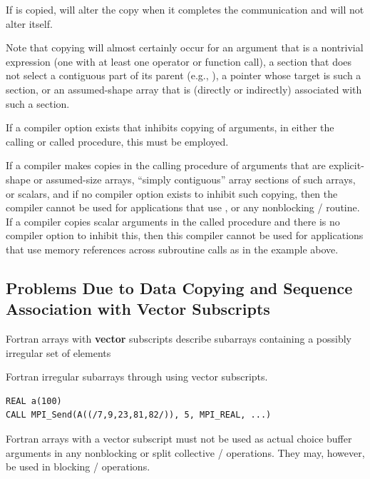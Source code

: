\begin{itemize}
If  is copied,  will alter the copy when it completes the
communication and will not alter  itself.

Note that copying will almost certainly occur for an argument that is a
nontrivial expression (one with at least one operator or function
call), a section that does not select a contiguous part of its parent
(e.g., ), a pointer whose target is such a section, or an
assumed-shape array that is (directly or indirectly) associated with
such a section.

If a compiler option exists that inhibits copying of arguments,
in either the calling or called procedure, this must be employed.

If a compiler makes copies in the calling procedure of arguments that
are explicit-shape or assumed-size arrays, ``simply contiguous'' array sections of
such arrays, or scalars, and if no compiler option exists to inhibit such copying,
then the compiler cannot be used for applications that use
, or any nonblocking \MPI/ routine.  If a
compiler copies scalar arguments in the called procedure and there is no
compiler option to inhibit this, then this compiler cannot be used for
applications that use memory references across subroutine calls as
in the example above.
\end{itemize}

\subsection{Problems Due to Data Copying and Sequence Association with Vector Subscripts}
\label{sec:f90-problems:vector-subscripts}
Fortran arrays with \textbf{vector} subscripts describe subarrays containing a
possibly irregular set of elements

\begin{example}
Fortran irregular subarrays through using vector subscripts.
\label{exa:lang:vector:subscripts}
%
\begin{lstlisting}[language={[MPI]Fortran}]
REAL a(100)
CALL MPI_Send(A((/7,9,23,81,82/)), 5, MPI_REAL, ...)
\end{lstlisting}
\end{example}

Fortran arrays with a vector subscript must not be used as actual choice buffer arguments
in any nonblocking or split collective \MPI/ operations. They may, however, be used in
blocking \MPI/ operations.

